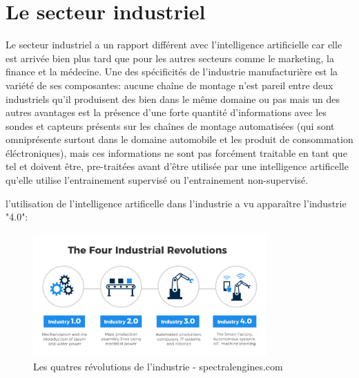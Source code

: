     \section{Le secteur industriel}
        Le secteur industriel a un rapport différent avec l'intelligence artificielle car elle est arrivée 
        bien plus tard que pour les autres secteurs comme le marketing, la finance et la médecine.
        Une des spécificités de l'industrie manufacturière est la variété de ses composantes: 
        aucune chaîne de montage n'est pareil entre deux industriels qu'il produisent des bien 
        dans le même domaine ou pas mais un des autres avantages est la présence d'une forte quantité 
        d'informations avec les sondes et capteurs présents sur les chaînes de montage automatisées 
        (qui sont omniprésente surtout dans le domaine automobile et les produit de consommation éléctroniques), 
        mais ces informations ne sont pas forcément traitable en tant que tel et doivent être, pre-traitées
        avant d'être utilisée par une intelligence artificelle qu'elle utilise l'entrainement 
        supervisé ou l'entrainement non-supervisé. \newline

        l'utilisation de l'intelligence artificelle dans l'industrie a vu apparaître 
        l'industrie "4.0":

        \begin{figure}[H]
            \centering
            \includegraphics[width=0.8\textwidth]{Images/industryfour}
            \caption{Les quatres révolutions de l'industrie - spectralengines.com}
            \label{fig:fourindustrialrevolutions}
        \end{figure}

